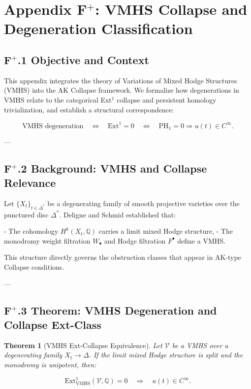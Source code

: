 \documentclass[11pt]{article}
\newtheorem{theorem}{Theorem}[section]
\begin{document}
\section*{Appendix F$^+$: VMHS Collapse and Degeneration Classification}

\subsection*{F$^+$.1 Objective and Context}

This appendix integrates the theory of Variations of Mixed Hodge Structures (VMHS) into the AK Collapse framework.  
We formalize how degenerations in VMHS relate to the categorical Ext$^1$ collapse and persistent homology trivialization,  
and establish a structural correspondence:

\[
\mathrm{VMHS} \text{ degeneration} \quad \Leftrightarrow \quad \mathrm{Ext}^1 = 0 \quad \Leftrightarrow \quad \mathrm{PH}_1 = 0 \Rightarrow u(t) \in C^\infty.
\]

---

\subsection*{F$^+$.2 Background: VMHS and Collapse Relevance}

Let \( \{X_t\}_{t \in \Delta^*} \) be a degenerating family of smooth projective varieties over the punctured disc \( \Delta^* \).  
Deligne and Schmid established that:

- The cohomology \( H^k(X_t, \mathbb{Q}) \) carries a limit mixed Hodge structure,
- The monodromy weight filtration \( W_\bullet \) and Hodge filtration \( F^\bullet \) define a VMHS.

This structure directly governs the obstruction classes that appear in AK-type Collapse conditions.

---

\subsection*{F$^+$.3 Theorem: VMHS Degeneration and Collapse Ext-Class}

\begin{theorem}[VMHS Ext-Collapse Equivalence]
Let \( \mathcal{V} \) be a VMHS over a degenerating family \( X_t \to \Delta \).  
If the limit mixed Hodge structure is split and the monodromy is unipotent, then:

\[
\mathrm{Ext}^1_{\mathrm{VMHS}}(\mathcal{V}, \mathbb{Q}) = 0 \quad \Rightarrow \quad u(t) \in C^\infty.
\]
\end{theorem}
\end{document}
